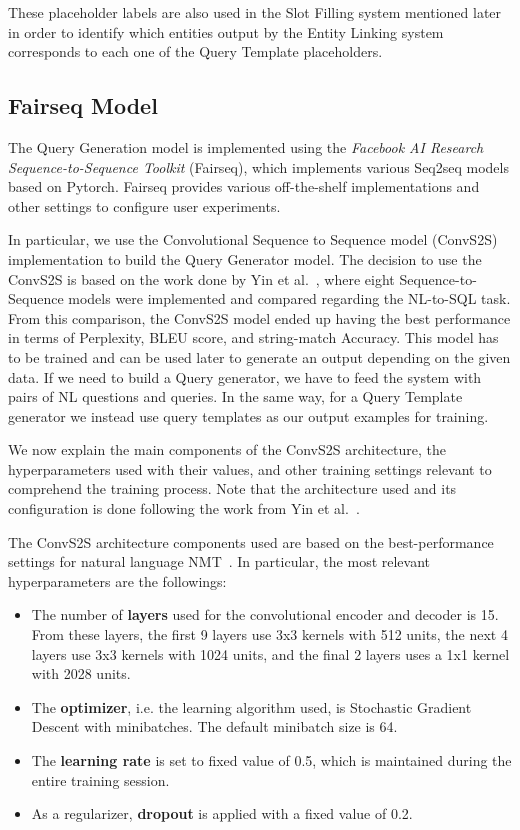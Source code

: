 These placeholder labels are also used in the Slot Filling system mentioned later in order to 
identify which entities output by the Entity Linking system corresponds to each one of the 
Query Template placeholders. 

\subsection{Fairseq Model}
\label{cap3:system/queryGenModule/fairseqModel}
The Query Generation model is implemented using the \textit{Facebook AI Research Sequence-to-Sequence 
Toolkit} (Fairseq), which implements various Seq2seq models based on Pytorch. Fairseq 
provides various off-the-shelf implementations and other settings to configure user 
experiments. 

In particular, we use the Convolutional Sequence to Sequence model (ConvS2S)~\cite{nmt:convS2S-GehringAGYD17} 
implementation to build the Query Generator model. The decision to use the ConvS2S is based 
on the work done by Yin et al.~\cite{nmt:nl-to-sparql-Yin19}, where eight Sequence-to-Sequence 
models were implemented and compared regarding the NL-to-SQL task. From this comparison, 
the ConvS2S model ended up having the best performance in terms of Perplexity, BLEU score, 
and string-match Accuracy. This model has to be trained and can be used later to generate an 
output depending on the given data. If we need to build a \SPARQL{} Query generator, we have to 
feed the system with pairs of NL questions and \SPARQL{} queries. In the same way, for a Query 
Template generator we instead use query templates as our output examples for training.

We now explain the main components of the ConvS2S architecture, the hyperparameters used with 
their values, and other training settings relevant to comprehend the training process. Note 
that the architecture used and its configuration is done following the work from 
Yin et al.~\cite{nmt:nl-to-sparql-Yin19}.

The ConvS2S architecture components used are based on the best-performance settings for 
natural language NMT~\cite{nmt:nl-to-sparql-Yin19}. In particular, the most relevant 
hyperparameters are the followings:

\begin{itemize}
    \item The number of \textbf{layers} used for the convolutional encoder and decoder is 15. 
    From these layers, the first 9 layers use 3x3 kernels with 512 units, the next 4 layers 
    use 3x3 kernels with 1024 units, and the final 2 layers uses a 1x1 kernel with 2028 units.
    \item The \textbf{optimizer}, i.e. the learning algorithm used, is Stochastic Gradient 
    Descent with minibatches. The default minibatch size is 64.
    \item The \textbf{learning rate} is set to fixed value of 0.5, which is maintained during 
    the entire training session.
    \item As a regularizer, \textbf{dropout} is applied with a fixed value of 0.2.
\end{itemize}

